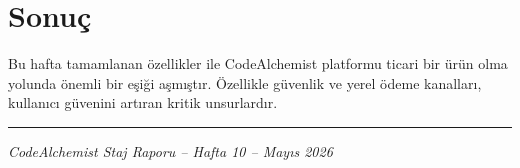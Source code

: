 \documentclass[12pt,a4paper]{article}
\begin{document}
\section{Sonuç}

Bu hafta tamamlanan özellikler ile CodeAlchemist platformu ticari bir ürün olma yolunda önemli bir eşiği aşmıştır. Özellikle güvenlik ve yerel ödeme kanalları, kullanıcı güvenini artıran kritik unsurlardır.

\vspace{1cm}
{\color{primaryviolet}\rule{\linewidth}{1pt}}
\begin{center}
\textit{CodeAlchemist Staj Raporu -- Hafta 10 -- Mayıs 2026}
\end{center}
\end{document}
